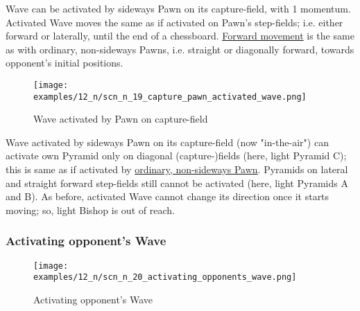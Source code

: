 \vspace*{-0.5\baselineskip}
Wave can be activated by sideways Pawn on its capture-field, with 1 momentum.
Activated Wave moves the same as if activated on Pawn's step-fields; i.e. either
forward or laterally, until the end of a chessboard.
\hyperref[fig:scn_mv_22_wave_activated_by_step_pawn]{Forward movement} is the
same as with ordinary, non-sideways Pawns, i.e. straight or diagonally forward,
towards opponent's initial positions.

\clearpage %

\vspace*{-2.1\baselineskip}
\noindent
\begin{figure}[!h]
\texttt{[image: examples/12\_n/scn\_n\_19\_capture\_pawn\_activated\_wave.png]}
\vspace*{-1.4\baselineskip}
\caption{Wave activated by Pawn on capture-field}
\label{fig:scn_n_19_capture_pawn_activated_wave}
\end{figure}

\vspace*{-0.5\baselineskip}
Wave activated by sideways Pawn on its capture-field (now "in-the-air") can
activate own Pyramid only on diagonal (capture-)fields (here, light Pyramid C);
this is same as if activated by
\hyperref[fig:scn_mv_24_wave_activated_by_capture_pawn]{ordinary, non-sideways Pawn}.
Pyramids on lateral and straight forward step-fields still cannot be activated
(here, light Pyramids A and B).\newline
\indent
As before, activated Wave cannot change its direction once it starts moving;
so, light Bishop is out of reach.

\clearpage %

\subsubsection*{Activating opponent's Wave}
\label{sec:Nineteen/Sideways Pawns/Activating Wave/Activating opponent's Wave}

\vspace*{-1.4\baselineskip}
\noindent
\begin{figure}[!h]
\texttt{[image: examples/12\_n/scn\_n\_20\_activating\_opponents\_wave.png]}
\vspace*{-1.4\baselineskip}
\caption{Activating opponent's Wave}
\label{fig:scn_n_20_activating_opponents_wave}
\end{figure}

